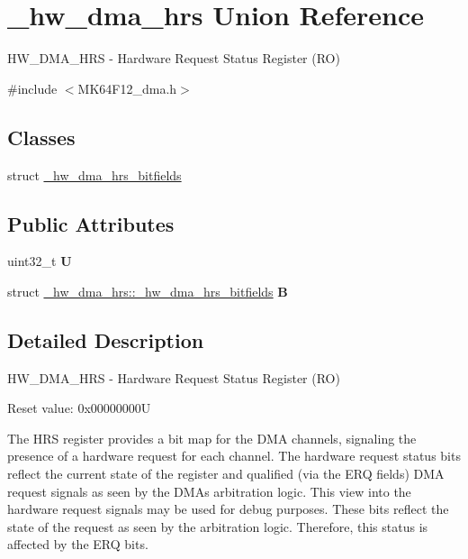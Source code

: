 \hypertarget{union__hw__dma__hrs}{}\section{\+\_\+hw\+\_\+dma\+\_\+hrs Union Reference}
\label{union__hw__dma__hrs}


H\+W\+\_\+\+D\+M\+A\+\_\+\+H\+RS -\/ Hardware Request Status Register (RO)  




{\ttfamily \#include $<$M\+K64\+F12\+\_\+dma.\+h$>$}

\subsection*{Classes}
\begin{DoxyCompactItemize}
\item 
struct \hyperlink{struct__hw__dma__hrs_1_1__hw__dma__hrs__bitfields}{\+\_\+hw\+\_\+dma\+\_\+hrs\+\_\+bitfields}
\end{DoxyCompactItemize}
\subsection*{Public Attributes}
\begin{DoxyCompactItemize}
\item 
uint32\+\_\+t {\bfseries U}\hypertarget{union__hw__dma__hrs_a92e2cf1e19b9f8599a0ea4c8219577e4}{}\label{union__hw__dma__hrs_a92e2cf1e19b9f8599a0ea4c8219577e4}

\item 
struct \hyperlink{struct__hw__dma__hrs_1_1__hw__dma__hrs__bitfields}{\+\_\+hw\+\_\+dma\+\_\+hrs\+::\+\_\+hw\+\_\+dma\+\_\+hrs\+\_\+bitfields} {\bfseries B}\hypertarget{union__hw__dma__hrs_ac16eabf08c6ec7d714c79005c1595dc6}{}\label{union__hw__dma__hrs_ac16eabf08c6ec7d714c79005c1595dc6}

\end{DoxyCompactItemize}


\subsection{Detailed Description}
H\+W\+\_\+\+D\+M\+A\+\_\+\+H\+RS -\/ Hardware Request Status Register (RO) 

Reset value\+: 0x00000000U

The H\+RS register provides a bit map for the D\+MA channels, signaling the presence of a hardware request for each channel. The hardware request status bits reflect the current state of the register and qualified (via the E\+RQ fields) D\+MA request signals as seen by the D\+MA\textquotesingle{}s arbitration logic. This view into the hardware request signals may be used for debug purposes. These bits reflect the state of the request as seen by the arbitration logic. Therefore, this status is affected by the E\+RQ bits. 

